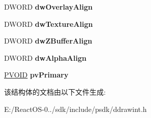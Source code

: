 \begin{DoxyCompactItemize}
\item 
\mbox{\label{struct___v_i_d_e_o_m_e_m_o_r_y_i_n_f_o_a4b31384b1bdb2e0afc17312f207b1aa9}} 
D\+W\+O\+RD {\bfseries dw\+Overlay\+Align}
\item 
\mbox{\label{struct___v_i_d_e_o_m_e_m_o_r_y_i_n_f_o_a9298817862b5e7f8488c5140c85cb062}} 
D\+W\+O\+RD {\bfseries dw\+Texture\+Align}
\item 
\mbox{\label{struct___v_i_d_e_o_m_e_m_o_r_y_i_n_f_o_a1cb39d9602d15bd50482c5f0d2fd216b}} 
D\+W\+O\+RD {\bfseries dw\+Z\+Buffer\+Align}
\item 
\mbox{\label{struct___v_i_d_e_o_m_e_m_o_r_y_i_n_f_o_a98f9e545604ef7f3464342e04637fc88}} 
D\+W\+O\+RD {\bfseries dw\+Alpha\+Align}
\item 
\mbox{\label{struct___v_i_d_e_o_m_e_m_o_r_y_i_n_f_o_affc0b9ad8d9cf895f137509fd10f7640}} 
\hyperlink{interfacevoid}{P\+V\+O\+ID} {\bfseries pv\+Primary}
\end{DoxyCompactItemize}


该结构体的文档由以下文件生成\+:\begin{DoxyCompactItemize}
\item 
E\+:/\+React\+O\+S-\/0../sdk/include/psdk/ddrawint.\+h\end{DoxyCompactItemize}

